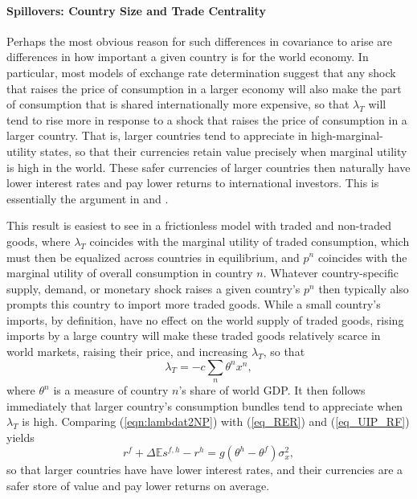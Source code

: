 \documentclass{ar-1col}
\begin{document}
\paragraph*{Spillovers: Country Size and Trade Centrality}

Perhaps the most obvious reason for such differences in covariance to arise are differences in how important a given country is for the world economy. In particular, most models of exchange rate determination suggest that any shock that raises the price of consumption in a larger economy will also make the part of consumption that is shared internationally more expensive, so that $\lambda_T$ will tend to rise more in response to a shock that raises the price of consumption in a larger country. That is, larger countries tend to appreciate in high-marginal-utility states, so that their currencies retain value precisely when marginal utility is high in the world. These safer currencies of larger countries then naturally have lower interest rates and pay lower returns to international investors. This is essentially the argument in \citet{Martin2012} and \citet{Hassan2013}.

This result is easiest to see in a frictionless model with traded and non-traded goods, where $\lambda_T$ coincides with the marginal utility of traded consumption, which must then be equalized across countries in equilibrium, and $p^n$ coincides with the marginal utility of overall consumption in country $n$. Whatever country-specific supply, demand, or monetary shock raises a given country's $p^n$ then typically also prompts this country to import more traded goods. While a small country's imports, by definition, have no effect on the world supply of traded goods, rising imports by a large country will make these traded goods relatively scarce in world markets, raising their price, and increasing $\lambda_T$, so that
\begin{equation} \lambda_{T} = -c \sum_{n} \theta^n x^n,
    \label{eqn:lambdat2NP}
\end{equation}
where $\theta^n$ is a measure of country $n$'s share of world GDP. It then follows immediately that larger country's consumption bundles tend to appreciate when $\lambda_T$ is high. Comparing (\ref{eqn:lambdat2NP}) with (\ref{eq_RER}) and (\ref{eq_UIP_RF}) yields
\begin{equation}
  r^{f} + \Delta \mathbb{E} s^{f, h} - r^{h}
  =g\left(\theta^h - \theta^f\right) \sigma_x^2,
  \label{eq_FF_UIP}
\end{equation}
so that larger countries have have lower interest rates, and their currencies are a safer store of value and pay lower returns on average.
  
\end{document}
